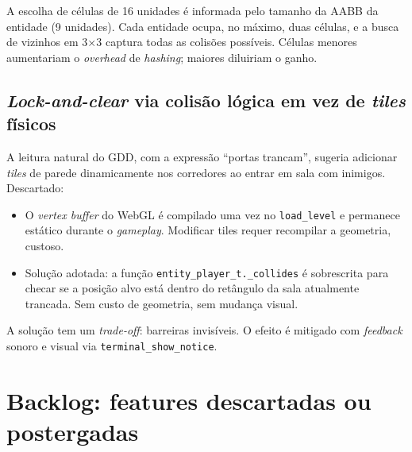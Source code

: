 A escolha de células de 16 unidades é informada pelo tamanho da AABB da entidade
(9 unidades). Cada entidade ocupa, no máximo, duas células, e a busca de vizinhos
em 3$\times$3 captura todas as colisões possíveis. Células menores aumentariam o
\emph{overhead} de \emph{hashing}; maiores diluiriam o ganho.

\subsection{\emph{Lock-and-clear} via colisão lógica em vez de \emph{tiles} físicos}

A leitura natural do GDD, com a expressão ``portas trancam'', sugeria adicionar
\emph{tiles} de parede dinamicamente nos corredores ao entrar em sala com
inimigos. Descartado:

\begin{itemize}
  \item O \emph{vertex buffer} do WebGL é compilado uma vez no \texttt{load\_level}
    e permanece estático durante o \emph{gameplay}. Modificar tiles requer
    recompilar a geometria, custoso.
  \item Solução adotada: a função \texttt{entity\_player\_t.\_collides} é
    sobrescrita para checar se a posição alvo está dentro do retângulo da sala
    atualmente trancada. Sem custo de geometria, sem mudança visual.
\end{itemize}

A solução tem um \emph{trade-off}: barreiras invisíveis. O efeito é mitigado com
\emph{feedback} sonoro e visual via \texttt{terminal\_show\_notice}.

\section{Backlog: features descartadas ou postergadas}

